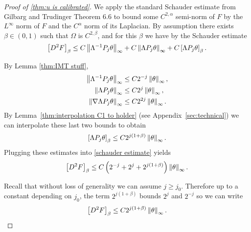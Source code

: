 \begin{proof}[Proof of \ref{thm:u is calibrated}]



We apply the standard Schauder estimate from Gilbarg and Trudinger \cite{GiTr} Theorem 6.6 to bound some $C^{2,\alpha}$ semi-norm of $F$ by the $L^\infty$ norm of $F$ and the $C^\alpha$ norm of its Laplacian.  By assumption there exists $\beta \in (0,1)$ such that $\Omega$ is $C^{2,\beta}$, and for this $\beta$ we have by the Schauder estimate
\begin{equation} \label{schauder estimate} \left[ D^2 F \right]_{\beta} \leq C \left\lVert\Lambda^{-1} P_j \theta\right\rVert_\infty + C \left\lVert\Lambda P_j \theta\right\rVert_\infty + C \left[ \Lambda P_j \theta \right]_{\beta}. \end{equation}

By Lemma \ref{thm:IMT stuff},
\begin{align*} 
\left\lVert\Lambda^{-1} P_j \theta\right\rVert_\infty &\leq C 2^{-j} \left\lVert\theta\right\rVert_\infty, \\
\left\lVert\Lambda P_j \theta\right\rVert_\infty &\leq C 2^j \left\lVert\theta\right\rVert_\infty, \\
\left\lVert\nabla \Lambda P_j \theta\right\rVert_\infty &\leq C 2^{2j} \left\lVert\theta\right\rVert_\infty. 
\end{align*}
By Lemma~\ref{thm:interpolation C1 to holder} (see Appendix~\ref{sec:technical}) we can interpolate these last two bounds to obtain
\[ \left[ \Lambda P_j \theta \right]_\beta \leq C 2^{j(1+\beta)} \left\lVert\theta\right\rVert_\infty. \]
Plugging these estimates into \eqref{schauder estimate} yields
\[ \left[ D^2 F \right]_\beta \leq C \left( 2^{-j} + 2^j + 2^{j(1+\beta)} \right) \left\lVert\theta\right\rVert_\infty. \]

Recall that without loss of generality we can assume $j \geq j_0$.  Therefore up to a constant depending on $j_0$, the term $2^{j(1+\beta)}$ bounds $2^j$ and $2^{-j}$ so we can write
\[ \left[ D^2 F \right]_\beta \leq C 2^{j(1+\beta)} \left\lVert\theta\right\rVert_\infty. \]


\end{proof}
